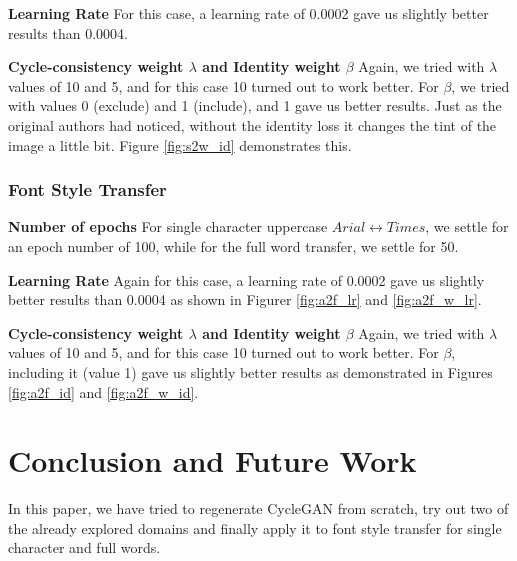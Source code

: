 \documentclass[10pt,twocolumn,letterpaper]{article}
\begin{document}
\noindent\textbf{Learning Rate} For this case, a learning rate of 0.0002 gave us slightly better results than 0.0004.

\noindent\textbf{Cycle-consistency weight $\lambda$ and Identity weight $\beta$} Again, we tried with 
$\lambda$ values of 10 and 5, and for this case 10 turned out to work better. For $\beta$, we tried 
with values 0 (exclude) and 1 (include), and 1 gave us better results. Just as the original authors \cite{cyclegan} had noticed, without the identity loss it changes the tint of the image a little bit. Figure \ref{fig:s2w_id} demonstrates this. 

\subsubsection{Font Style Transfer}
\noindent\textbf{Number of epochs} For single character uppercase $Arial \leftrightarrow Times$, we settle for an epoch number of 100, while for the full word transfer, we settle for 50.

\noindent\textbf{Learning Rate} Again for this case, a learning rate of 0.0002 gave us slightly better results than 0.0004 as shown in Figurer \ref{fig:a2f_lr} and \ref{fig:a2f_w_lr}.

\noindent\textbf{Cycle-consistency weight $\lambda$ and Identity weight $\beta$} Again, we tried with 
$\lambda$ values of 10 and 5, and for this case 10 turned out to work better. For $\beta$, including it (value 1) gave us slightly better results as demonstrated in Figures \ref{fig:a2f_id} and \ref{fig:a2f_w_id}.

\section{Conclusion and Future Work}

In this paper, we have tried to regenerate CycleGAN \cite{cyclegan} from scratch, try
out two of the already explored domains and finally apply it to font style transfer
for single character and full words.

{\small


}
\end{document}
